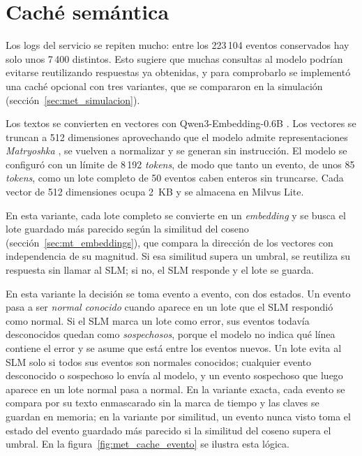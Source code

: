 \section{Caché semántica}\label{sec:met_cache}

Los logs del servicio se repiten mucho: entre los 223\,104 eventos conservados hay solo unos 7\,400 distintos. Esto sugiere que muchas consultas al modelo podrían evitarse reutilizando respuestas ya obtenidas, y para comprobarlo se implementó una caché opcional con tres variantes, que se compararon en la simulación (sección~\ref{sec:met_simulacion}).


Los textos se convierten en vectores con Qwen3-Embedding-0.6B \cite{zhang2025_qwen3emb}. Los vectores se truncan a 512 dimensiones aprovechando que el modelo admite representaciones \textit{Matryoshka} \cite{kusupati2022_matryoshka}, se vuelven a normalizar y se generan sin instrucción. El modelo se configuró con un límite de 8\,192 \textit{tokens}, de modo que tanto un evento, de unos 85 \textit{tokens}, como un lote completo de 50 eventos caben enteros sin truncarse. Cada vector de 512 dimensiones ocupa 2~KB y se almacena en Milvus Lite.


En esta variante, cada lote completo se convierte en un \textit{embedding} y se busca el lote guardado más parecido según la similitud del coseno (sección~\ref{sec:mt_embeddings}), que compara la dirección de los vectores con independencia de su magnitud. Si esa similitud supera un umbral, se reutiliza su respuesta sin llamar al SLM; si no, el SLM responde y el lote se guarda.


En esta variante la decisión se toma evento a evento, con dos estados. Un evento pasa a ser \emph{normal conocido} cuando aparece en un lote que el SLM respondió como normal. Si el SLM marca un lote como error, sus eventos todavía desconocidos quedan como \emph{sospechosos}, porque el modelo no indica qué línea contiene el error y se asume que está entre los eventos nuevos. Un lote evita al SLM solo si todos sus eventos son normales conocidos; cualquier evento desconocido o sospechoso lo envía al modelo, y un evento sospechoso que luego aparece en un lote normal pasa a normal. En la variante exacta, cada evento se compara por su texto enmascarado sin la marca de tiempo y las claves se guardan en memoria; en la variante por similitud, un evento nunca visto toma el estado del evento guardado más parecido si la similitud del coseno supera el umbral. En la figura~\ref{fig:met_cache_evento} se ilustra esta lógica.

